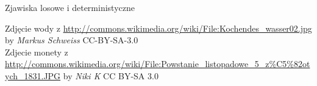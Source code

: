 \documentclass{mp}
\subtitle{Aksjomatyka rachunku prawdopodobieństwa}
\begin{document}
\frame{\titlepage}
\begin{frame}{Zjawiska losowe i deterministyczne}
\begin{center}
\end{center}
\vfill
{\tiny Zdjęcie wody z \url{http://commons.wikimedia.org/wiki/File:Kochendes_wasser02.jpg} by \emph{Markus Schweiss} CC-BY-SA-3.0\\
Zdjecie monety z \url{http://commons.wikimedia.org/wiki/File:Powstanie_listopadowe_5_z\%C5\%82otych_1831.JPG} by \emph{Niki K} CC BY-SA 3.0}
\end{frame}
\end{document}

